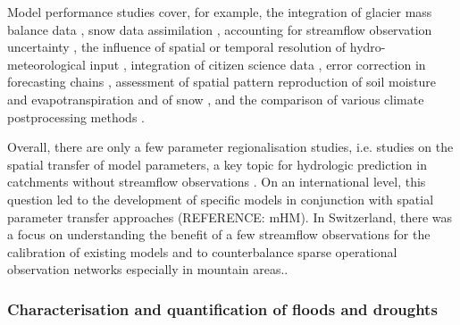 \documentclass[10pt,a4paper]{article}
\begin{document}
Model performance studies cover, for example, the integration of glacier mass balance data \citep{Finger2015, Schaefli2011}, snow data assimilation \citep{Griessinger2016}, accounting for streamflow observation uncertainty \citep{Westerberg2020}, the influence of spatial or temporal resolution of hydro-meteorological input \citep{GironsLopez2016, Felder2017, Sikorska2018}, integration of citizen science data \citep{Etter2020}, error correction in forecasting chains \citep{Bogner2018}, assessment of spatial pattern reproduction of soil moisture and evapotranspiration \citep{Rossler2010, Zappa2003} and of snow \citep{Zappa2008a}, and the comparison of various climate postprocessing methods \citep{Rossler2019}.

Overall, there are only a few parameter regionalisation studies, i.e. studies on the spatial transfer of model parameters, a key topic for hydrologic prediction in catchments without streamflow observations \citep{Guo2021}. On an international level, this question led to the development of specific models in conjunction with spatial parameter transfer approaches (REFERENCE: mHM). In Switzerland, there was a focus on understanding the benefit of a few streamflow observations for the calibration of existing models and to  
counterbalance sparse operational observation networks especially in mountain areas.. 


\subsubsection{Characterisation and quantification of floods and droughts}
\label{sec:context:floodsdroughts}
\end{document}
